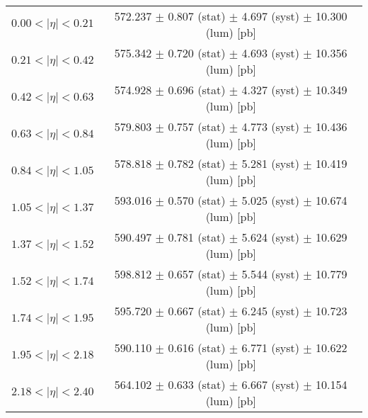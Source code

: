 \begin{tabular}{lc}
\hline
$0.00 < |\eta| <0.21$          & 572.237 $\pm$ 0.807 (stat) $\pm$ 4.697 (syst) $\pm$ 10.300 (lum) [pb]  \\
$0.21 < |\eta| <0.42$          & 575.342 $\pm$ 0.720 (stat) $\pm$ 4.693 (syst) $\pm$ 10.356 (lum) [pb]  \\
$0.42 < |\eta| <0.63$          & 574.928 $\pm$ 0.696 (stat) $\pm$ 4.327 (syst) $\pm$ 10.349 (lum) [pb]  \\
$0.63 < |\eta| <0.84$          & 579.803 $\pm$ 0.757 (stat) $\pm$ 4.773 (syst) $\pm$ 10.436 (lum) [pb]  \\
$0.84 < |\eta| <1.05$          & 578.818 $\pm$ 0.782 (stat) $\pm$ 5.281 (syst) $\pm$ 10.419 (lum) [pb]  \\
$1.05 < |\eta| <1.37$          & 593.016 $\pm$ 0.570 (stat) $\pm$ 5.025 (syst) $\pm$ 10.674 (lum) [pb]  \\
$1.37 < |\eta| <1.52$          & 590.497 $\pm$ 0.781 (stat) $\pm$ 5.624 (syst) $\pm$ 10.629 (lum) [pb]  \\
$1.52 < |\eta| <1.74$          & 598.812 $\pm$ 0.657 (stat) $\pm$ 5.544 (syst) $\pm$ 10.779 (lum) [pb]  \\
$1.74 < |\eta| <1.95$          & 595.720 $\pm$ 0.667 (stat) $\pm$ 6.245 (syst) $\pm$ 10.723 (lum) [pb]  \\
$1.95 < |\eta| <2.18$          & 590.110 $\pm$ 0.616 (stat) $\pm$ 6.771 (syst) $\pm$ 10.622 (lum) [pb]  \\
$2.18 < |\eta| <2.40$          & 564.102 $\pm$ 0.633 (stat) $\pm$ 6.667 (syst) $\pm$ 10.154 (lum) [pb]  \\
\hline
\end{tabular}
